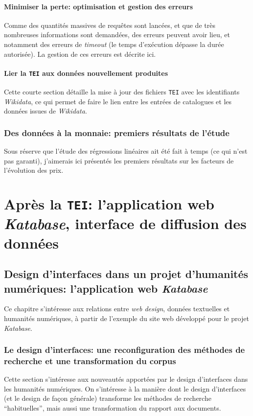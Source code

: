 \documentclass[a4paper, 12pt, twoside]{book}
\newcommand{\ktb}{\textit{Katabase}}
\newcommand{\tei}{\texttt{TEI}}
\newcommand{\wkd}{\textit{Wikidata}}
\begin{document}
\subsection{Minimiser la perte: optimisation et gestion des erreurs}
Comme des quantités massives de requêtes sont lancées, et que de très nombreuses informations sont demandées, des erreurs peuvent avoir lieu, et notamment des erreurs de \textit{timeout} (le temps d'exécution dépasse la durée autorisée). La gestion de ces erreurs est décrite ici.

\subsection{Lier la \tei{} aux données nouvellement produites}
Cette courte section détaille la mise à jour des fichiers \tei{} avec les identifiants \wkd{}, ce qui permet de faire le lien entre les entrées de catalogues et les données issues de \wkd{}.

\section{Des données à la monnaie: premiers résultats de l'étude}
Sous réserve que l'étude des régressions linéaires ait été fait à temps (ce qui n'est pas garanti), j'aimerais ici présentés les premiers résultats sur les facteurs de l'évolution des prix.


\part{Après la \tei{}: l'application web \ktb{}, interface de diffusion des données}
\chapter{Design d'interfaces dans un projet d'humanités numériques: l'application web \ktb{}}
Ce chapitre s'intéresse aux relations entre \textit{web design}, données textuelles et humanités numériques, à partir de l'exemple du site web développé pour le projet \ktb{}.

\section{Le design d'interfaces: une reconfiguration des méthodes de recherche et une transformation du corpus}
Cette section s'intéresse aux nouveautés apportées par le design d'interfaces dans les humanités numériques. On s'intéresse à la manière dont le design d'interfaces (et le design de façon générale) transforme les méthodes de recherche \enquote{habituelles}, mais aussi une transformation du rapport aux documents.
\end{document}
